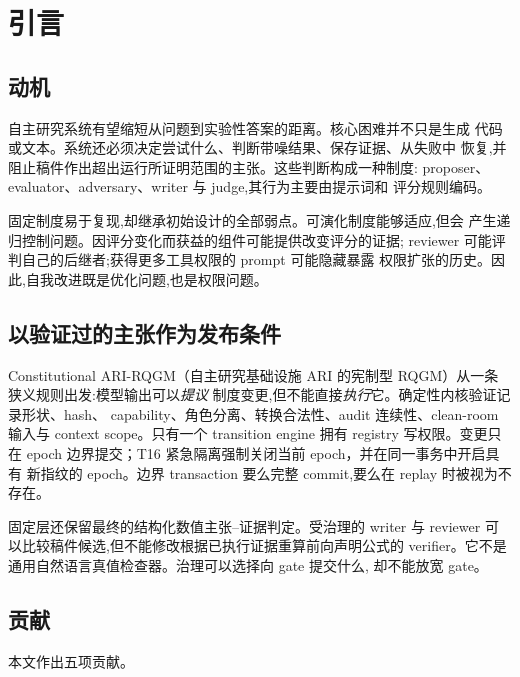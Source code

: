 \section{引言}\label{sec:intro}

\subsection{动机}\label{sec:intro:motivation}

自主研究系统有望缩短从问题到实验性答案的距离。核心困难并不只是生成
代码或文本。系统还必须决定尝试什么、判断带噪结果、保存证据、从失败中
恢复,并阻止稿件作出超出运行所证明范围的主张。这些判断构成一种制度:
proposer、evaluator、adversary、writer 与 judge,其行为主要由提示词和
评分规则编码。

固定制度易于复现,却继承初始设计的全部弱点。可演化制度能够适应,但会
产生递归控制问题。因评分变化而获益的组件可能提供改变评分的证据;
reviewer 可能评判自己的后继者;获得更多工具权限的 prompt 可能隐藏暴露
权限扩张的历史。因此,自我改进既是优化问题,也是权限问题。

\subsection{以验证过的主张作为发布条件}\label{sec:intro:verified}

Constitutional ARI-RQGM（自主研究基础设施 ARI 的宪制型 RQGM）从一条
狭义规则出发:模型输出可以\emph{提议}
制度变更,但不能直接\emph{执行}它。确定性内核验证记录形状、hash、
capability、角色分离、转换合法性、audit 连续性、clean-room 输入与
context scope。只有一个 transition engine 拥有 registry 写权限。变更只在
epoch 边界提交；T16 紧急隔离强制关闭当前 epoch，并在同一事务中开启具有
新指纹的 epoch。边界 transaction 要么完整 commit,要么在 replay 时被视为不存在。

固定层还保留最终的结构化数值主张--证据判定。受治理的 writer 与
reviewer 可以比较稿件候选,但不能修改根据已执行证据重算前向声明公式的
verifier。它不是通用自然语言真值检查器。治理可以选择向 gate 提交什么,
却不能放宽 gate。

\subsection{贡献}\label{sec:intro:contrib}

本文作出五项贡献。

